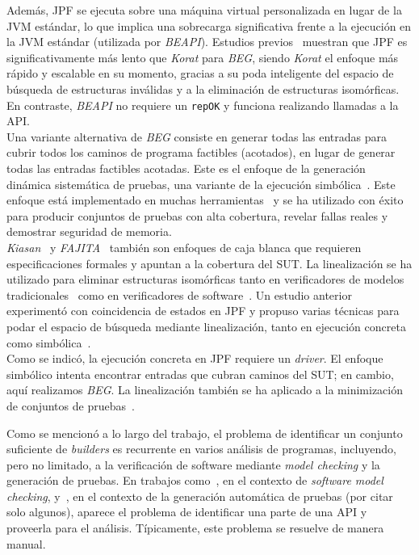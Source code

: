 Además, JPF se ejecuta sobre una máquina virtual personalizada en lugar de la JVM estándar, 
lo que implica una sobrecarga significativa frente a la ejecución en la JVM estándar 
(utilizada por \textit{BEAPI}). Estudios previos~\cite{ref32} muestran que JPF es significativamente 
más lento que \textit{Korat} para \textit{BEG}, siendo \textit{Korat} el enfoque más rápido y escalable en 
su momento, gracias a su poda inteligente del espacio de búsqueda de estructuras inválidas 
y a la eliminación de estructuras isomórficas. En contraste, \textit{BEAPI} no requiere un 
\texttt{repOK} y funciona realizando llamadas a la API. \\

Una variante alternativa de \textit{BEG} consiste en generar todas las entradas para cubrir 
todos los caminos de programa factibles (acotados), en lugar de generar todas las entradas 
factibles acotadas. Este es el enfoque de la generación dinámica sistemática de pruebas, 
una variante de la ejecución simbólica~\cite{ref14}. Este enfoque está implementado en muchas 
herramientas~\cite{ref13,ref12,ref24,ref8} y se ha utilizado con éxito para producir conjuntos de 
pruebas con alta cobertura, revelar fallas reales y demostrar seguridad de memoria. \\

\textit{Kiasan}~\cite{ref9} y \textit{FAJITA}~\cite{ref1} también son enfoques de caja blanca que requieren 
especificaciones formales y apuntan a la cobertura del SUT. La linealización se ha utilizado 
para eliminar estructuras isomórficas tanto en verificadores de modelos tradicionales~\cite{ref15,ref28} 
como en verificadores de software~\cite{ref35}. Un estudio anterior experimentó con coincidencia 
de estados en JPF y propuso varias técnicas para podar el espacio de búsqueda mediante linealización, 
tanto en ejecución concreta como simbólica~\cite{ref35}. \\

Como se indicó, la ejecución concreta en JPF requiere un \textit{driver}. El enfoque simbólico intenta 
encontrar entradas que cubran caminos del SUT; en cambio, aquí realizamos \textit{BEG}. La linealización 
también se ha aplicado a la minimización de conjuntos de pruebas~\cite{ref36}.

Como se mencionó a lo largo del trabajo, el problema de identificar un conjunto 
suficiente de \textit{builders} es recurrente en varios análisis de programas, incluyendo, 
pero no limitado, a la verificación de software mediante \textit{model checking} y la 
generación de pruebas. En trabajos como~\cite{ref22,ref17}, en el contexto de 
\textit{software model checking}, y~\cite{ref30,ref29,ref23,ref5}, en el contexto de la 
generación automática de pruebas (por citar solo algunos), aparece el problema de 
identificar una parte de una API y proveerla para el análisis. Típicamente, este 
problema se resuelve de manera manual. \\

